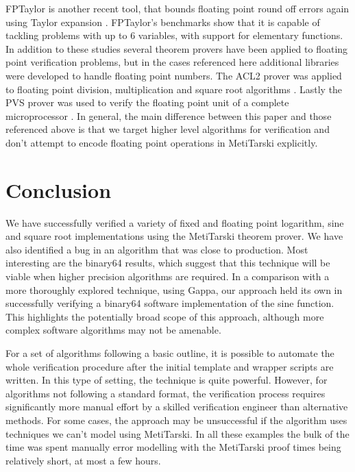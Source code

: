 \documentclass{fac}
\begin{document}
FPTaylor is another recent tool, that bounds floating point round off errors again using Taylor expansion \cite{solovyev2018rigorous}. FPTaylor's benchmarks show that it is capable of tackling problems with up to 6 variables, with support for elementary functions. In addition to these studies several theorem provers have been applied to floating point verification problems, but in the cases referenced here additional libraries were developed to handle floating point numbers. The ACL2 prover was applied to floating point division, multiplication and square root algorithms \cite{russinoff1998mechanically,moore1996mechanically}. Lastly the PVS prover was used to verify the floating point unit of a complete microprocessor \cite{jacobi2005formal}. In general, the main difference between this paper and those referenced above is that we target higher level algorithms for verification and don't attempt to encode floating point operations in MetiTarski explicitly. 

\section{Conclusion}
\label{Conclusion}
We have successfully verified a variety of fixed and floating point logarithm, sine and square root implementations using the MetiTarski theorem prover.
We have also identified a bug in an algorithm that was close to production. Most interesting are the binary64 results, which suggest that this technique will be viable when higher precision algorithms are required. In a comparison with a more thoroughly explored technique, using Gappa, our approach held its own in successfully verifying a binary64 software implementation of the sine function. This highlights the potentially broad scope of this approach, although more complex software algorithms may not be amenable. 

For a set of algorithms following a basic outline, it is possible to automate the whole verification procedure after the initial template and wrapper scripts are written. In this type of setting, the technique is quite powerful. However, for algorithms not following a standard format, the verification process requires significantly more manual effort by a skilled verification engineer than alternative methods. For some cases, the approach may be unsuccessful if the algorithm uses techniques we can't model using MetiTarski. In all these examples the bulk of the time was spent manually error modelling with the MetiTarski proof times being relatively short, at most a few hours. 
\end{document}

